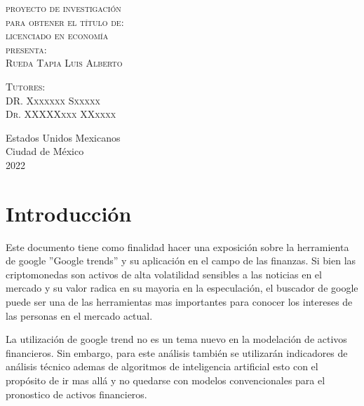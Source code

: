 \documentclass[letterpaper,12pt,oneside]{book}
\begin{document}
\begin{titlepage}
\begin{minipage}[c][0.81\textheight][t]{0.75\textwidth}
\begin{center}
      \vspace{2cm}            


      \textsc{\large proyecto de investigación}\\[2cm]
      \textsc{\large para obtener el título de:}\\[0.5cm]
      \textsc{\large licenciado en economía}\\[0.5cm]
      
      {\color{red}\textsc{\large presenta:}}\\[0.5cm]
      \textsc{\large {Rueda Tapia Luis Alberto}}\\[1cm]          

      \vspace{0.5cm}

      {\large\scshape 
        {\color{red}Tutores:}\\[0.3cm] {DR. Xxxxxxx Sxxxxx \\ 
          Dr. XXXXXxxx XXxxxx}}\\[.2in]

      \vspace{1cm}

      \large{Estados Unidos Mexicanos\\ 
        Ciudad de México\\
        2022}
    \end{center}
  \end{minipage}
\end{titlepage}

\frontmatter
\chapter*{Introducción}
Este documento tiene como finalidad hacer una exposición
sobre la herramienta de google ''Google trends'' y su aplicación
en el campo de las finanzas.
Si bien las criptomonedas son activos de alta volatilidad sensibles
a las noticias en el mercado y su valor radica en su mayoria en la especulación,
el buscador de google puede ser una de las herramientas mas importantes para
conocer los intereses de las personas en el mercado actual.

La utilización de google trend no es un tema nuevo en la modelación de activos
financieros. Sin embargo, para este análisis también se utilizarán indicadores de análisis técnico ademas de algoritmos de inteligencia artificial esto con el propósito de ir mas allá y no quedarse con modelos convencionales para el pronostico de activos financieros.
\end{document}
